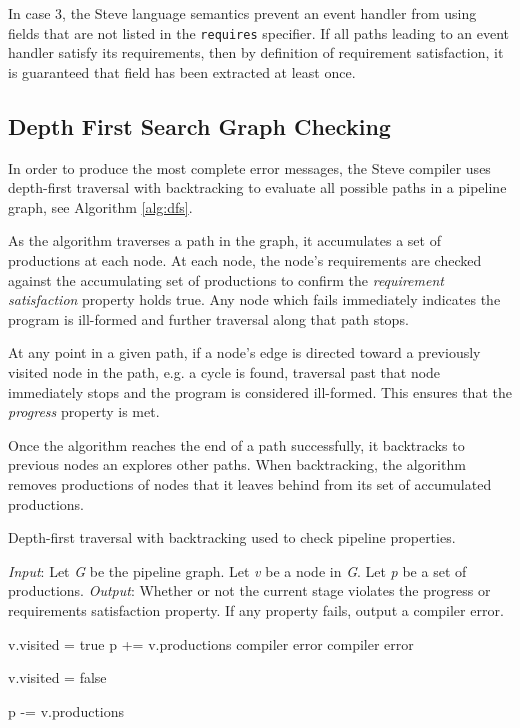 In case 3, the Steve language semantics prevent an event handler from using fields
that are not listed in the \texttt{requires} specifier. If all paths
leading to an event handler satisfy its requirements, then by definition of requirement
satisfaction, it is guaranteed that field has been extracted at least once.

\subsection{Depth First Search Graph Checking} \label{guide:dfs_desc}

In order to produce the most complete error messages, the Steve compiler uses depth-first traversal with backtracking to evaluate all possible paths in a pipeline graph, see Algorithm \ref{alg:dfs}. 

As the algorithm traverses a path in the graph, it accumulates a set of productions at each node. At each node, the node's requirements are checked against the accumulating set of productions to confirm the \textit{requirement satisfaction} property holds true. Any node which fails immediately indicates the program is ill-formed and further traversal along that path stops.

At any point in a given path, if a node's edge is directed toward a previously visited node in the path, e.g. a cycle is found, traversal past that node immediately stops and the program is considered ill-formed. This ensures that the \textit{progress} property is met.

Once the algorithm reaches the end of a path successfully, it backtracks to previous
nodes an explores other paths. When backtracking, the algorithm removes
productions of nodes that it leaves behind from its set of accumulated productions.

\begin{algorithm}[ht]
 \caption{Depth-first traversal with backtracking used to check pipeline properties.}
 \label{alg:dfs}
 \begin{algorithmic}
 \State
 \State \textit{Input}: Let \textit{G} be the pipeline graph. Let \textit{v} be a node in \textit{G}. Let \textit{p} be a set of productions.
 \State \textit{Output}: Whether or not the current stage violates the progress or requirements satisfaction property. If any property fails, output a compiler error.
 \State

 	\State v.visited = true
 	\State p  += v.productions
 				\State {}
 			\Else
 				\State \Return compiler error
 			\EndIf
 		\EndFor
	\Else
 		\State \Return compiler error
 	\EndIf
 	
	
 	\State v.visited = false 

 	\State p -= v.productions 
 \EndFunction
 \end{algorithmic}

\end{algorithm}

